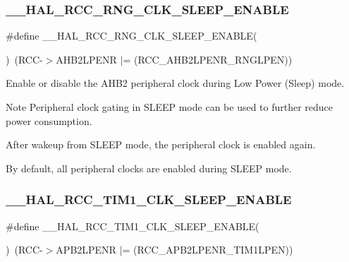 \subsubsection{\texorpdfstring{\_\_HAL\_RCC\_RNG\_CLK\_SLEEP\_ENABLE}{\_\_HAL\_RCC\_RNG\_CLK\_SLEEP\_ENABLE}}
{\footnotesize\ttfamily \#define \+\_\+\+\_\+\+H\+A\+L\+\_\+\+R\+C\+C\+\_\+\+R\+N\+G\+\_\+\+C\+L\+K\+\_\+\+S\+L\+E\+E\+P\+\_\+\+E\+N\+A\+B\+LE(\begin{DoxyParamCaption}{ }\end{DoxyParamCaption})~(R\+CC-\/$>$A\+H\+B2\+L\+P\+E\+NR $\vert$= (R\+C\+C\+\_\+\+A\+H\+B2\+L\+P\+E\+N\+R\+\_\+\+R\+N\+G\+L\+P\+EN))}



Enable or disable the A\+H\+B2 peripheral clock during Low Power (Sleep) mode. 

\begin{DoxyNote}{Note}
Peripheral clock gating in S\+L\+E\+EP mode can be used to further reduce power consumption. 

After wakeup from S\+L\+E\+EP mode, the peripheral clock is enabled again. 

By default, all peripheral clocks are enabled during S\+L\+E\+EP mode. 
\end{DoxyNote}
\mbox{\label{group___r_c_c_ex___peripheral___clock___sleep___enable___disable_ga6ce02f1b2689c664010bebc2363d1db4}} 
\subsubsection{\texorpdfstring{\_\_HAL\_RCC\_TIM1\_CLK\_SLEEP\_ENABLE}{\_\_HAL\_RCC\_TIM1\_CLK\_SLEEP\_ENABLE}}
{\footnotesize\ttfamily \#define \+\_\+\+\_\+\+H\+A\+L\+\_\+\+R\+C\+C\+\_\+\+T\+I\+M1\+\_\+\+C\+L\+K\+\_\+\+S\+L\+E\+E\+P\+\_\+\+E\+N\+A\+B\+LE(\begin{DoxyParamCaption}{ }\end{DoxyParamCaption})~(R\+CC-\/$>$A\+P\+B2\+L\+P\+E\+NR $\vert$= (R\+C\+C\+\_\+\+A\+P\+B2\+L\+P\+E\+N\+R\+\_\+\+T\+I\+M1\+L\+P\+EN))}



